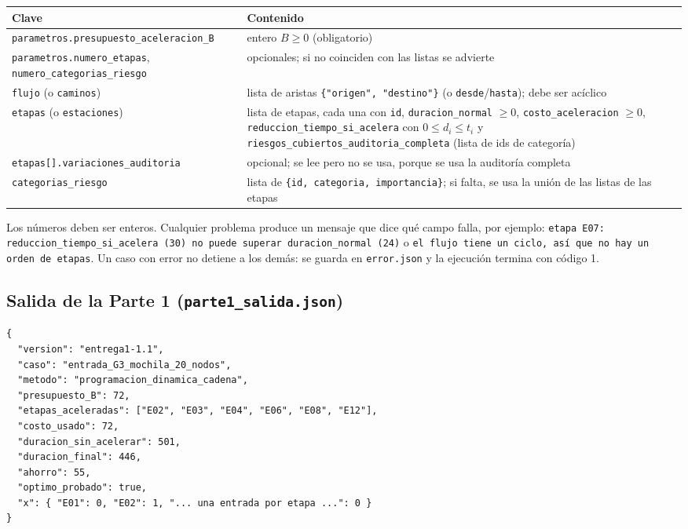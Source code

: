 \documentclass[11pt,a4paper]{article}
\begin{document}
\begin{center}
\small
\begin{tabular}{@{}>{\raggedright\arraybackslash}p{5.6cm}>{\raggedright\arraybackslash}p{9.2cm}@{}}
\toprule
Clave & Contenido\\
\midrule
\texttt{parametros.\allowbreak presupuesto\_\allowbreak aceleracion\_B} & entero $B\ge 0$ (obligatorio)\\
\texttt{parametros.numero\_etapas}, \texttt{numero\_categorias\_riesgo} & opcionales; si no coinciden con las listas se advierte\\
\texttt{flujo} (o \texttt{caminos}) & lista de aristas \texttt{\{"origen", "destino"\}} (o \texttt{desde}/\texttt{hasta}); debe ser acíclico\\
\texttt{etapas} (o \texttt{estaciones}) & lista de etapas, cada una con \texttt{id}, \texttt{duracion\_normal} $\ge 0$, \texttt{costo\_aceleracion} $\ge 0$, \texttt{reduccion\_tiempo\_si\_acelera} con $0\le d_i\le t_i$ y \texttt{riesgos\_cubiertos\_auditoria\_completa} (lista de ids de categoría)\\
\texttt{etapas[].\allowbreak variaciones\_\allowbreak auditoria} & opcional; se lee pero no se usa, porque se usa la auditoría completa\\
\texttt{categorias\_riesgo} & lista de \texttt{\{id, categoria, importancia\}}; si falta, se usa la unión de las listas de las etapas\\
\bottomrule
\end{tabular}
\end{center}

Los números deben ser enteros. Cualquier problema produce un mensaje que dice qué campo falla, por ejemplo: \texttt{etapa E07: reduccion\_tiempo\_si\_acelera (30) no puede superar duracion\_normal (24)} o \texttt{el flujo tiene un ciclo, así que no hay un orden de etapas}. Un caso con error no detiene a los demás: se guarda en \texttt{error.json} y la ejecución termina con código 1.

\subsection{Salida de la Parte 1 (\texttt{parte1\_salida.json})}

\begin{Verbatim}
{
  "version": "entrega1-1.1",
  "caso": "entrada_G3_mochila_20_nodos",
  "metodo": "programacion_dinamica_cadena",
  "presupuesto_B": 72,
  "etapas_aceleradas": ["E02", "E03", "E04", "E06", "E08", "E12"],
  "costo_usado": 72,
  "duracion_sin_acelerar": 501,
  "duracion_final": 446,
  "ahorro": 55,
  "optimo_probado": true,
  "x": { "E01": 0, "E02": 1, "... una entrada por etapa ...": 0 }
}
\end{Verbatim}
\end{document}
